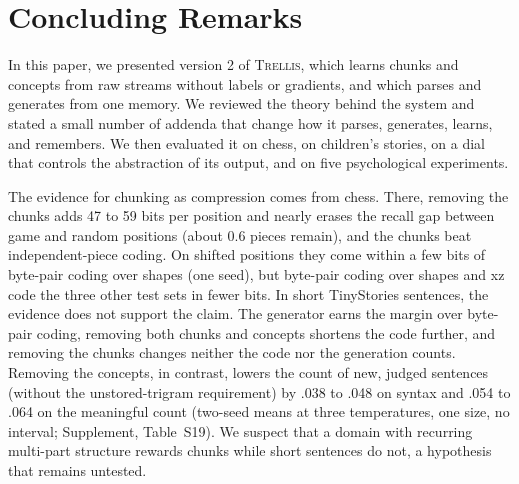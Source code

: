 \documentclass[11pt,letterpaper]{article}
\newcommand{\trellis}{\textsc{Trellis}}
\begin{document}
\section{Concluding Remarks}

In this paper, we presented version 2 of \trellis{}, which learns chunks and concepts
from raw streams without labels or gradients, and which parses and generates from one
memory. We reviewed the theory behind the system and stated a small number of addenda
that change how it parses, generates, learns, and remembers. We then evaluated it on
chess, on children's stories, on a dial that controls the abstraction of its output,
and on five psychological experiments.

The evidence for chunking as compression comes from chess. There, removing the chunks
adds 47 to 59 bits per position and nearly erases the recall gap between game and
random positions (about 0.6 pieces remain), and the chunks beat independent-piece
coding. On shifted positions they come within a few bits of byte-pair coding over
shapes (one seed), but byte-pair coding over shapes and xz code the three other test
sets in fewer bits. In short TinyStories sentences, the evidence does not support the
claim. The generator earns the margin over byte-pair coding, removing both chunks and
concepts shortens the code further, and removing the chunks changes neither the code
nor the generation counts. Removing the concepts, in contrast, lowers the count of new,
judged sentences (without the unstored-trigram requirement) by .038 to .048 on syntax
and .054 to .064 on the meaningful count (two-seed means at three temperatures, one
size, no interval; Supplement, Table~S19). We suspect that a domain with recurring
multi-part structure rewards chunks while short sentences do not, a hypothesis that
remains untested.
\end{document}
